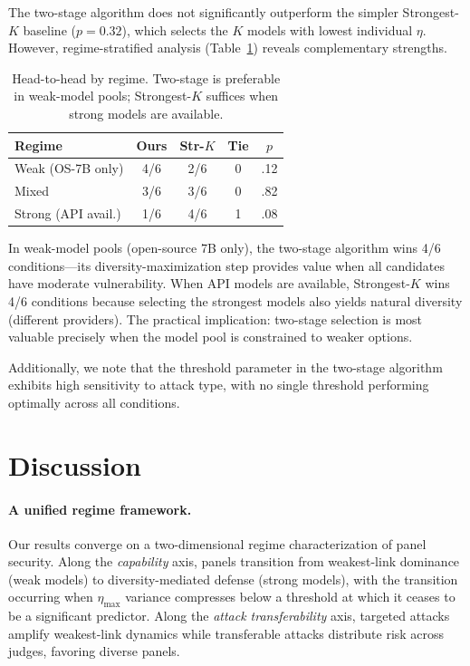 \documentclass[11pt]{article}
\begin{document}
The two-stage algorithm does not significantly outperform the simpler Strongest-$K$ baseline ($p = 0.32$), which selects the $K$ models with lowest individual $\eta$.
However, regime-stratified analysis (Table~\ref{tab:selection_regime}) reveals complementary strengths.

\begin{table}[t]
\centering
\small
\begin{tabular}{lcccc}
\toprule
\textbf{Regime} & \textbf{Ours} & \textbf{Str-$K$} & \textbf{Tie} & $p$ \\
\midrule
Weak (OS-7B only) & 4/6 & 2/6 & 0 & .12 \\
Mixed & 3/6 & 3/6 & 0 & .82 \\
Strong (API avail.) & 1/6 & 4/6 & 1 & .08 \\
\bottomrule
\end{tabular}
\caption{Head-to-head by regime. Two-stage is preferable in weak-model pools; Strongest-$K$ suffices when strong models are available.}
\label{tab:selection_regime}
\end{table}

In weak-model pools (open-source 7B only), the two-stage algorithm wins 4/6 conditions---its diversity-maximization step provides value when all candidates have moderate vulnerability.
When API models are available, Strongest-$K$ wins 4/6 conditions because selecting the strongest models also yields natural diversity (different providers).
The practical implication: two-stage selection is most valuable precisely when the model pool is constrained to weaker options.

Additionally, we note that the threshold parameter in the two-stage algorithm exhibits high sensitivity to attack type, with no single threshold performing optimally across all conditions.

\section{Discussion}

\paragraph{A unified regime framework.}
Our results converge on a two-dimensional regime characterization of panel security.
Along the \emph{capability} axis, panels transition from weakest-link dominance (weak models) to diversity-mediated defense (strong models), with the transition occurring when $\eta_{\max}$ variance compresses below a threshold at which it ceases to be a significant predictor.
Along the \emph{attack transferability} axis, targeted attacks amplify weakest-link dynamics while transferable attacks distribute risk across judges, favoring diverse panels.
\end{document}
